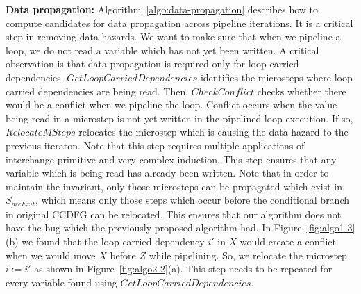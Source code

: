 {\bf Data propagation:} Algorithm~\ref{algo:data-propagation} describes how to compute candidates for data
propagation across pipeline iterations. It is a critical step in removing data hazards. We want to make sure that when we pipeline a loop, we do not read a variable which has not
yet been written. A critical observation is that data propagation is required only for loop carried dependencies.
$GetLoopCarriedDependencies$ identifies the microsteps where loop carried dependencies are being read. Then,
$CheckConflict$ checks whether there would be a conflict when we pipeline the loop. Conflict occurs when the value being read in a microstep is not yet written in the pipelined loop execution. If so, $RelocateMSteps$ relocates the microstep which is causing the data hazard to the previous iteraton. Note that this step requires multiple applications of interchange primitive and very complex induction. This step ensures that any variable which is being read has already been written. Note that in order to maintain the invariant, only those microsteps can be propagated which exist in $S_{preExit}$, which means only those steps which occur before the conditional branch in original CCDFG can be relocated. This ensures that our algorithm does not have the bug which the previously proposed algorithm had. In Figure~\ref{fig:algo1-3}(b) we found that the loop carried dependency $i'$ in $X$ would create a conflict when we would move $X$ before $Z$ while pipelining. So, we relocate the microstep $i := i'$ as shown in Figure~\ref{fig:algo2-2}(a). This step needs to be repeated for every variable found using $GetLoopCarriedDependencies$.

